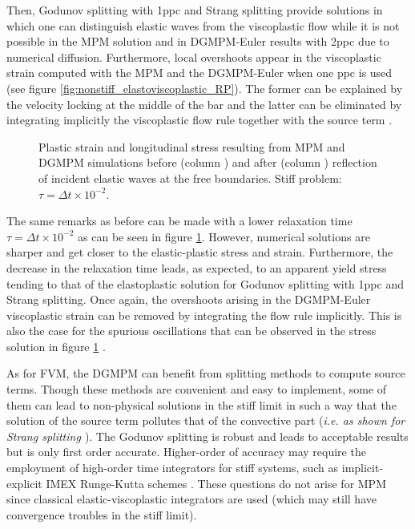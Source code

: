 Then, Godunov splitting with 1ppc and Strang splitting provide solutions in which one can distinguish elastic waves from the viscoplastic flow while it is not possible in the MPM solution and in DGMPM-Euler results with 2ppc due to numerical diffusion.
Furthermore, local overshoots appear in the viscoplastic strain computed with the MPM and the DGMPM-Euler when one ppc is used (see figure \ref{fig:nonstiff_elastoviscoplastic_RP}). 
The former can be explained by the velocity locking at the middle of the bar and the latter can be eliminated by integrating implicitly the viscoplastic flow rule together with the source term \cite{Thomas_EVP}.
\begin{figure}[h!]
  \centering
  { \label{subfig:evp_stiff1}}
  { \label{subfig:evp_stiff3}}
  {}
  \caption{Plastic strain and longitudinal stress resulting from MPM and DGMPM simulations before (column ) and after (column ) reflection of incident elastic waves at the free boundaries. Stiff problem: $\tau=\Delta t \times 10^{-2}$.}
  \label{fig:siff_elastoviscoplastic_RP}
\end{figure}

The same remarks as before can be made with a lower relaxation time $\tau=\Delta t \times 10^{-2}$ as can be seen in figure \ref{fig:siff_elastoviscoplastic_RP}. However, numerical solutions are sharper and get closer to the elastic-plastic stress and strain.
Furthermore, the decrease in the relaxation time leads, as expected, to an apparent yield stress tending to that of the elastoplastic solution for Godunov splitting with 1ppc and Strang splitting.
Once again, the overshoots arising in the DGMPM-Euler viscoplastic strain can be removed by integrating the flow rule implicitly.
This is also the case for the spurious oscillations that can be observed in the stress solution in figure \ref{fig:siff_elastoviscoplastic_RP} \cite{Thomas_EVP}. 


As for FVM, the DGMPM can benefit from splitting methods to compute source terms.
Though these methods are convenient and easy to implement, some of them can lead to non-physical solutions in the stiff limit in such a way that the solution of the source term pollutes that of the convective part (\textit{i.e. as shown for Strang splitting \cite{Thomas_EVP}}).
The Godunov splitting is robust and leads to acceptable results but is only first order accurate.
Higher-order of accuracy may require the employment of high-order time integrators for stiff systems, such as implicit-explicit IMEX Runge-Kutta schemes \cite{Pareschi_stiff}.
These questions do not arise for MPM since classical elastic-viscoplastic integrators are used (which may still have convergence troubles in the stiff limit).


